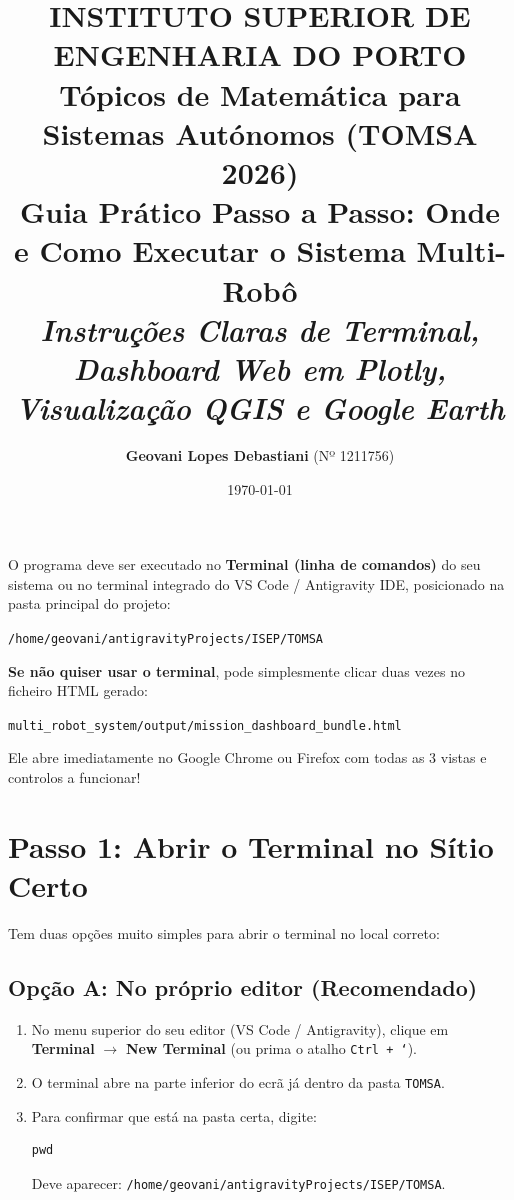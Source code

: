 \documentclass[11pt,a4paper]{article}
\title{
    \vspace{-1.0cm}
    \textbf{INSTITUTO SUPERIOR DE ENGENHARIA DO PORTO}\\[0.2cm]
    \large Tópicos de Matemática para Sistemas Autónomos (TOMSA 2026)\\[0.4cm]
    \Large \textbf{Guia Prático Passo a Passo: Onde e Como Executar o Sistema Multi-Robô}\\[0.2cm]
    \large \textit{Instruções Claras de Terminal, Dashboard Web em Plotly, Visualização QGIS e Google Earth}
}
\author{\textbf{Geovani Lopes Debastiani} (Nº 1211756)}
\date{\today}
\begin{document}
\maketitle

\begin{tcolorbox}[colback=boxbg,colframe=boxframe,title=\textbf{Resposta Rápida: Onde Rodar o Programa?}]
O programa deve ser executado no \textbf{Terminal (linha de comandos)} do seu sistema ou no terminal integrado do VS Code / Antigravity IDE, posicionado na pasta principal do projeto:
\begin{center}
\texttt{/home/geovani/antigravityProjects/ISEP/TOMSA}
\end{center}
\textbf{Se não quiser usar o terminal}, pode simplesmente clicar duas vezes no ficheiro HTML gerado:
\begin{center}
\texttt{multi\_robot\_system/output/mission\_dashboard\_bundle.html}
\end{center}
Ele abre imediatamente no Google Chrome ou Firefox com todas as 3 vistas e controlos a funcionar!
\end{tcolorbox}

\vspace{0.4cm}

\section{Passo 1: Abrir o Terminal no Sítio Certo}

Tem duas opções muito simples para abrir o terminal no local correto:

\subsection{Opção A: No próprio editor (Recomendado)}
\begin{enumerate}[leftmargin=1.5cm]
    \item No menu superior do seu editor (VS Code / Antigravity), clique em \textbf{Terminal} $\to$ \textbf{New Terminal} (ou prima o atalho \texttt{Ctrl + `}).
    \item O terminal abre na parte inferior do ecrã já dentro da pasta \texttt{TOMSA}.
    \item Para confirmar que está na pasta certa, digite:
\begin{lstlisting}
pwd
\end{lstlisting}
    Deve aparecer: \texttt{/home/geovani/antigravityProjects/ISEP/TOMSA}.
\end{enumerate}
\end{document}
